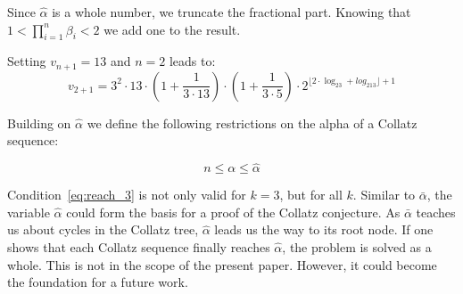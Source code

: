 \par\medskip
Since $\hat\alpha$ is a whole number, we truncate the fractional part. Knowing that $1<\prod_{i=1}^{n}\beta_i<2$ we add one to the result.

\bigskip
\begin{example}
Setting $v_{n+1}=13$ and $n=2$ leads to:
\[
v_{2+1}=3^2\cdot13\cdot\left(1+\frac{1}{3\cdot13}\right)\cdot\left(1+\frac{1}{3\cdot5}\right)\cdot2^{\lfloor2\cdot\log_23+log_213\rfloor+1}
\]
\end{example}

Building on $\hat\alpha$ we define the following restrictions on the alpha of a Collatz sequence:

\begin{equation}
\label{eq:reach_3}
n\le\alpha\le\hat\alpha
\end{equation}

Condition~\ref{eq:reach_3} is not only valid for $k=3$, but for all $k$. Similar to $\bar\alpha$, the variable $\hat\alpha$ could form the basis for a proof of the Collatz conjecture. As $\bar\alpha$ teaches us about cycles in the Collatz tree, $\hat\alpha$ leads us the way to its root node. If one shows that each Collatz sequence finally reaches $\hat\alpha$, the problem is solved as a whole. This is not in the scope of the present paper. However, it could become the foundation for a future work.

